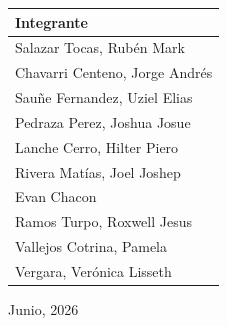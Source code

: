 \documentclass[11pt, a4paper, oneside]{report}
\begin{document}
\begin{titlepage}
  \begin{tabular}{@{}|l|@{}}
    \arrayrulecolor{upeu_dark}
    \rowcolor{upeu_dark}
    {\color{white}\bfseries\small Integrante} \\ \hline
    {\color{body_gray}\small Salazar Tocas, Rubén Mark} \\ \hline
    {\color{body_gray}\small Chavarri Centeno, Jorge Andrés} \\ \hline
    {\color{body_gray}\small Sauñe Fernandez, Uziel Elias} \\ \hline
    {\color{body_gray}\small Pedraza Perez, Joshua Josue} \\ \hline
    {\color{body_gray}\small Lanche Cerro, Hilter Piero} \\ \hline
    {\color{body_gray}\small Rivera Matías, Joel Joshep} \\ \hline
    {\color{body_gray}\small Evan Chacon} \\ \hline
    {\color{body_gray}\small Ramos Turpo, Roxwell Jesus} \\ \hline
    {\color{body_gray}\small Vallejos Cotrina, Pamela} \\ \hline
    {\color{body_gray}\small Vergara, Verónica Lisseth} \\ \hline
  \end{tabular}

  \vspace{0.6cm}
  {\color{body_gray} Junio, 2026}

  \vspace*{\fill}

\end{titlepage}

\newpage

\thispagestyle{empty}
\vspace{2cm}
\end{document}
